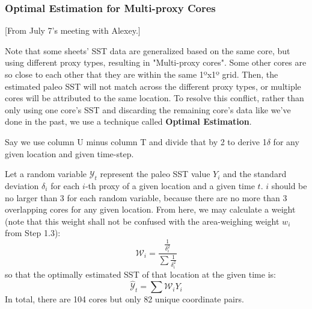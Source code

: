 \documentclass{article}
\begin{document}
\subsubsection{Optimal Estimation for Multi-proxy Cores}
\color{purple} [From July 7's meeting with Alexey.] \color{black}


Note that some sheets' SST data are generalized based on the same core, but using different proxy types, resulting in "Multi-proxy cores".
Some other cores are so close to each other that they are within the same 1ºx1º grid.
Then, the estimated paleo SST will not match across the different proxy types, or multiple cores will be attributed to the same location.
To resolve this conflict, rather than only using one core's SST and discarding the remaining core's data like we've done in the past, we use a technique called \textbf{Optimal Estimation}.

Say we use column U minus column T and divide that by 2 to derive 1$\delta$ for any given location and given time-step.

Let a random variable $\mathcal{Y}_t$ represent the paleo SST value $Y_i$ and the standard deviation $\delta_i$ for each $i$-th proxy of a given location and a given time $t$. 
$i$ should be no larger than 3 for each random variable, because there are no more than 3 overlapping cores for any given location. 
From here, we may calculate a weight (note that this weight shall not be confused with the area-weighing weight $w_i$ from Step 1.3):
$$\mathcal{W}_i = \frac{\frac{1}{\delta_i^2}}{\sum \frac{1} {\delta_i^2}}$$
so that the optimally estimated SST of that location at the given time is:
$$\hat{\mathcal{Y}}_t = \sum \mathcal{W}_i Y_i$$
In total, there are 104 cores but only 82 unique coordinate pairs.

\end{document}
